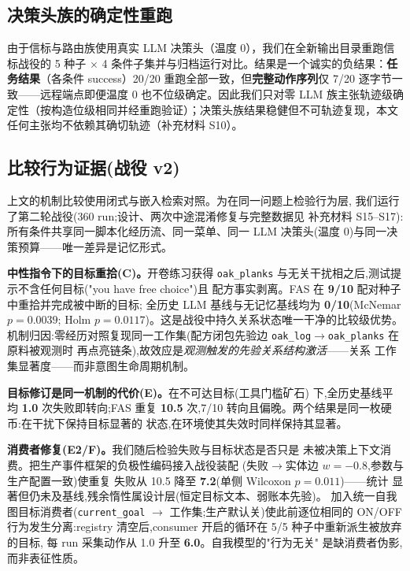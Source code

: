 \documentclass[10pt,a4paper]{ctexart}
\begin{document}
\subsection{决策头族的确定性重跑}
\label{sec:res-rerun}
由于信标与路由族使用真实 LLM 决策头（温度 0），我们在全新输出目录重跑信标战役的 5 种子 $\times$ 4 条件子集并与归档运行对比。结果是一个诚实的负结果：\textbf{任务结果}（各条件 success）20/20 重跑全部一致，但\textbf{完整动作序列}仅 7/20 逐字节一致——远程端点即便温度 0 也不位级确定。因此我们只对零 LLM 族主张轨迹级确定性（按构造位级相同并经重跑验证）；决策头族结果稳健但不可轨迹复现，本文任何主张均不依赖其确切轨迹（补充材料 S10）。


\subsection{比较行为证据(战役 v2)}
\label{sec:res-campaign}

上文的机制比较使用闭式与嵌入检索对照。为在同一问题上检验行为层,
我们运行了第二轮战役(360 run;设计、两次中途混淆修复与完整数据见
补充材料 S15--S17):所有条件共享同一脚本化经历流、同一菜单、同一
LLM 决策头(温度 0)与同一决策预算——唯一差异是记忆形式。

\textbf{中性指令下的目标重拾(C)。}开卷练习获得 \texttt{oak\_planks}
与无关干扰相之后,测试提示不含任何目标("you have free choice")且
配方事实剥离。FAS 在 \textbf{9/10} 配对种子中重拾并完成被中断的目标;
全历史 LLM 基线与无记忆基线均为 \textbf{0/10}(McNemar $p{=}0.0039$;
Holm $p{=}0.0117$)。这是战役中持久关系状态唯一干净的比较级优势。
机制归因:零经历对照复现同一工作集(配方闭包先验边
\texttt{oak\_log}$\rightarrow$\texttt{oak\_planks} 在原料被观测时
再点亮链条),故效应是\emph{观测触发的先验关系结构激活}——关系
工作集显著度——而非意图生命周期机制。

\textbf{目标修订是同一机制的代价(E)。}在不可达目标(工具门槛矿石)
下,全历史基线平均 \textbf{1.0} 次失败即转向;FAS 重复 \textbf{10.5}
次,7/10 转向且偏晚。两个结果是同一枚硬币:在干扰下保持目标显著的
状态,在环境使其失效时同样保持其显著。

\textbf{消费者修复(E2/F)。}我们随后检验失败与目标状态是否只是
未被决策上下文消费。把生产事件框架的负极性编码接入战役装配
(失败$\rightarrow$实体边 $w{=}{-}0.8$,参数与生产配置一致)使重复
失败从 10.5 降至 \textbf{7.2}(单侧 Wilcoxon $p{=}0.011$)——统计
显著但仍未及基线,残余惰性属设计层(恒定目标文本、弱账本先验)。
加入统一自我图目标消费者(\texttt{current\_goal} $\rightarrow$
工作集;生产默认关)使此前逐位相同的 ON/OFF 行为发生分离:registry
清空后,consumer 开启的循环在 5/5 种子中重新派生被放弃的目标,
每 run 采集动作从 1.0 升至 \textbf{6.0}。自我模型的"行为无关"
是缺消费者伪影,而非表征性质。
\end{document}

